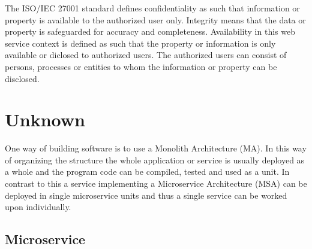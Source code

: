 The ISO/IEC 27001 standard defines confidentiality as such that information or property is available to the authorized user only.
Integrity means that the data or property is safeguarded for accuracy and completeness.
Availability in this web service context is defined as such that the property or information is only available or diclosed to authorized users.
The authorized users can consist of persons, processes or entities to whom the information or property can be disclosed.

\section{Unknown}

One way of building software is to use a Monolith Architecture (MA).
In this way of organizing the structure the whole application or service 
is usually deployed as a whole and the program code can be compiled, tested and
used as a unit. In contrast to this a service implementing a Microservice 
Architecture (MSA) can be deployed in single microservice units and thus a single service 
can be worked upon individually.





\begin{sloppypar}

\end{sloppypar}

\subsection{Microservice}





